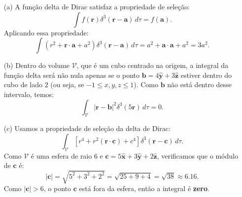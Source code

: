 \documentclass[a4paper,12pt]{article}
\begin{document}
\begin{enumerate}
    \item[(a)] A função delta de Dirac satisfaz a propriedade de seleção:
    \begin{equation}
    \int f(\mathbf{r}) \delta^3(\mathbf{r} - \mathbf{a}) \, d\tau = f(\mathbf{a}).
    \end{equation}
    Aplicando essa propriedade:
    \begin{equation}
    \int (r^2 + \mathbf{r} \cdot \mathbf{a} + a^2) \delta^3(\mathbf{r} - \mathbf{a}) \, d\tau = a^2 + \mathbf{a} \cdot \mathbf{a} + a^2 = 3a^2.
    \end{equation}

    \item[(b)] Dentro do volume $\mathcal{V}$, que é um cubo centrado na origem, a integral da função delta será não nula apenas se o ponto $\mathbf{b} = 4\hat{\mathbf{y}} + 3\hat{\mathbf{z}}$ estiver dentro do cubo de lado $2$ (ou seja, se $-1 \leq x, y, z \leq 1$). Como $\mathbf{b}$ não está dentro desse intervalo, temos:
    \begin{equation}
    \int_{\mathcal{V}} |\mathbf{r} - \mathbf{b}|^2 \delta^3(5\mathbf{r}) \, d\tau = 0.
    \end{equation}

    \item[(c)] Usamos a propriedade de seleção da delta de Dirac:
    \begin{equation}
    \int_{\mathcal{V}} \left[ r^4 + r^2 (\mathbf{r} \cdot \mathbf{c}) + c^4 \right] \delta^3(\mathbf{r} - \mathbf{c}) \, d\tau.
    \end{equation}
    Como $\mathcal{V}$ é uma esfera de raio $6$ e $\mathbf{c} = 5\hat{\mathbf{x}} + 3\hat{\mathbf{y}} + 2\hat{\mathbf{z}}$, verificamos que o módulo de $\mathbf{c}$ é:
    \begin{equation}
    |\mathbf{c}| = \sqrt{5^2 + 3^2 + 2^2} = \sqrt{25 + 9 + 4} = \sqrt{38} \approx 6.16.
    \end{equation}
    Como $|\mathbf{c}| > 6$, o ponto $\mathbf{c}$ está fora da esfera, então a integral é \textbf{zero}.


\end{enumerate}
\end{document}
